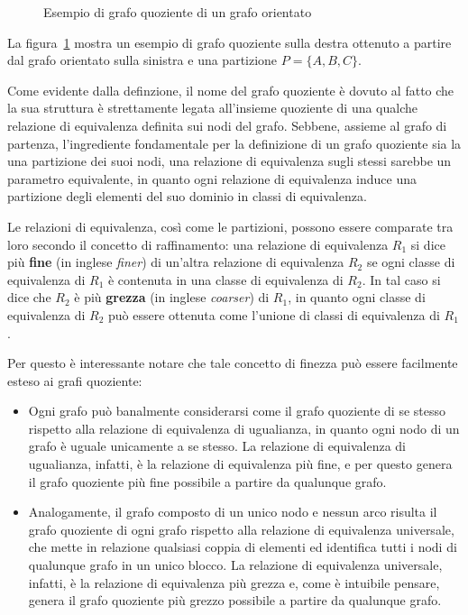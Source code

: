\begin{figure}[h]
    \centering
    
    \caption{Esempio di grafo quoziente di un grafo orientato}
    \label{fig:quotient-graph-example}
\end{figure}

La figura~\ref{fig:quotient-graph-example} mostra un esempio di grafo quoziente sulla destra ottenuto a partire dal
grafo orientato sulla sinistra e una partizione $P = \{A, B, C\}$. \newline

Come evidente dalla definzione, il nome del grafo quoziente \`e dovuto al fatto che la sua struttura \`e
strettamente legata all'insieme quoziente di una qualche relazione di equivalenza definita sui nodi del grafo.
Sebbene, assieme al grafo di partenza, l'ingrediente fondamentale per la definizione di un grafo quoziente sia la
una partizione dei suoi nodi, una relazione di equivalenza sugli stessi sarebbe un parametro equivalente, in quanto
ogni relazione di equivalenza induce una partizione degli elementi del suo dominio in classi di equivalenza.

Le relazioni di equivalenza, così come le partizioni, possono essere comparate tra
loro secondo il concetto di raffinamento: una relazione di equivalenza $R_1$ si dice più \textbf{fine}
(in inglese \textit{finer}) di un'altra relazione di equivalenza $R_2$ se ogni classe di equivalenza di $R_1$ \`e
contenuta in una classe di equivalenza di $R_2$.
In tal caso si dice che $R_2$ \`e più \textbf{grezza} (in inglese \textit{coarser}) di $R_1$, in quanto ogni classe
di equivalenza di $R_2$ pu\`o essere ottenuta come l'unione di classi di equivalenza di $R_1$. \newline

Per questo \`e interessante notare che tale concetto di finezza pu\`o essere facilmente esteso ai grafi quoziente:
\begin{itemize}
    \item Ogni grafo pu\`o banalmente considerarsi come il grafo quoziente di se stesso rispetto
    alla relazione di equivalenza di ugualianza, in quanto ogni nodo di un grafo \`e uguale unicamente a se stesso.
    La relazione di equivalenza di ugualianza, infatti, \`e la relazione di equivalenza pi\`u fine, e per questo
    genera il grafo quoziente pi\`u fine possibile a partire da qualunque grafo.
    \item Analogamente, il grafo composto di un unico nodo e nessun arco risulta il grafo quoziente di ogni grafo
    rispetto alla relazione di equivalenza universale, che mette in relazione qualsiasi coppia di elementi ed
    identifica tutti i nodi di qualunque grafo in un unico blocco.
    La relazione di equivalenza universale, infatti, \`e la relazione di equivalenza pi\`u grezza e, come \`e
    intuibile pensare, genera il grafo quoziente pi\`u grezzo possibile a partire da qualunque grafo.
\end{itemize}

